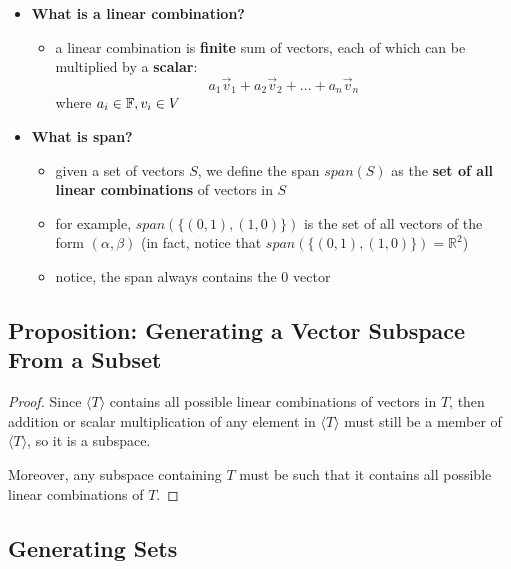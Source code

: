 \documentclass{exam}
\begin{document}
\begin{itemize}
    \item \textbf{What is a linear combination?}
    \begin{itemize}
        \item a linear combination is \textbf{finite} sum of vectors, each of which can be multiplied by a \textbf{scalar}:
        \[
        a_1\vec{v}_1 + a_2\vec{v}_2 + \ldots + a_n\vec{v}_n
        \]
        where $a_i \in \mathbb{F}, v_i \in V$
    \end{itemize}
    \item \textbf{What is span?}
    \begin{itemize}
        \item given a set of vectors $S$, we define the span $span(S)$ as the \textbf{set of all linear combinations} of vectors in $S$
        \item for example, $span\left(\{(0,1), (1,0)\}\right)$ is the set of all vectors of the form $(\alpha, \beta)$ (in fact, notice that $span\left(\{(0,1), (1,0)\}\right) = \mathbb{R}^2$)
        \item notice, the span always contains the 0 vector
    \end{itemize}
\end{itemize}

\subsection{Proposition: Generating a Vector Subspace From a Subset}


\begin{proof}
Since $\langle T \rangle$ contains all possible linear combinations of vectors in $T$, then addition or scalar multiplication of any element in $\langle T \rangle$ must still be a member of $\langle T \rangle$, so it is a subspace.

Moreover, any subspace containing $T$ must be such that it contains all possible linear combinations of $T$.

\end{proof}

\subsection{Generating Sets}
\end{document}
